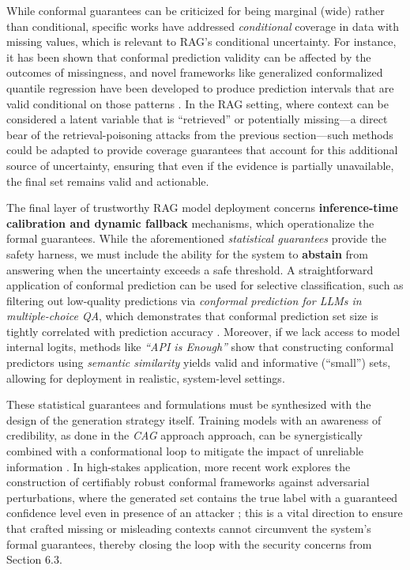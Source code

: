 \documentclass[11pt]{article}
\begin{document}
While conformal guarantees can be criticized for being marginal (wide) rather than conditional, specific works have addressed \emph{conditional} coverage in data with missing values, which is relevant to RAG's conditional uncertainty. For instance, it has been shown that conformal prediction validity can be affected by the outcomes of missingness, and novel frameworks like generalized conformalized quantile regression have been developed to produce prediction intervals that are valid conditional on those patterns \cite{ref294}. In the RAG setting, where context can be considered a latent variable that is ``retrieved'' or potentially missing---a direct bear of the retrieval-poisoning attacks from the previous section---such methods could be adapted to provide coverage guarantees that account for this additional source of uncertainty, ensuring that even if the evidence is partially unavailable, the final set remains valid and actionable.

The final layer of trustworthy RAG model deployment concerns \textbf{inference-time calibration and dynamic fallback} mechanisms, which operationalize the formal guarantees. While the aforementioned \emph{statistical guarantees} \cite{ref184} provide the safety harness, we must include the ability for the system to \textbf{abstain} from answering when the uncertainty exceeds a safe threshold. A straightforward application of conformal prediction can be used for selective classification, such as filtering out low-quality predictions via \emph{conformal prediction for LLMs in multiple-choice QA}, which demonstrates that conformal prediction set size is tightly correlated with prediction accuracy \cite{ref295}. Moreover, if we lack access to model internal logits, methods like \emph{``API is Enough''} \cite{ref296} show that constructing conformal predictors using \emph{semantic similarity} yields valid and informative (``small'') sets, allowing for deployment in realistic, system-level settings.

These statistical guarantees and formulations must be synthesized with the design of the generation strategy itself. Training models with an awareness of credibility, as done in the \emph{CAG} approach approach, can be synergistically combined with a conformational loop to mitigate the impact of unreliable information \cite{ref35}. In high-stakes application, more recent work explores the construction of certifiably robust conformal frameworks against adversarial perturbations, where the generated set contains the true label with a guaranteed confidence level even in presence of an attacker \cite{ref297}; this is a vital direction to ensure that crafted missing or misleading contexts cannot circumvent the system's formal guarantees, thereby closing the loop with the security concerns from Section 6.3.
\end{document}
